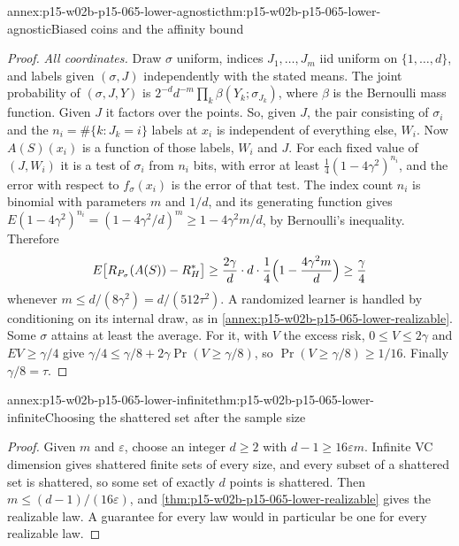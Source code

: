 \begin{annexitem}{annex:p15-w02b-p15-065-lower-agnostic}{thm:p15-w02b-p15-065-lower-agnostic}{Biased coins and the affinity bound}
\begin{proof}
\emph{All coordinates.} Draw \(\sigma\) uniform, indices \(J_1,\ldots,J_m\)
iid uniform on \(\{1,\ldots,d\}\), and labels given \((\sigma,J)\)
independently with the stated means. The joint probability of
\((\sigma,J,Y)\) is \(2^{-d}d^{-m}\prod_k\beta(Y_k;\sigma_{J_k})\), where
\(\beta\) is the Bernoulli mass function. Given \(J\) it factors over the
points. So, given \(J\), the pair consisting of \(\sigma_i\) and the
\(n_i=\#\{k:J_k=i\}\) labels at \(x_i\) is independent of everything else,
\(W_i\). Now \(A(S)(x_i)\) is a function of those labels, \(W_i\) and
\(J\). For each fixed value of \((J,W_i)\) it is a test of \(\sigma_i\)
from \(n_i\) bits, with error at least \(\frac14(1-4\gamma^2)^{n_i}\), and
the error with respect to \(f_\sigma(x_i)\) is the error of that test.
The index count \(n_i\) is binomial with parameters \(m\) and \(1/d\), and its
generating function gives
\(E(1-4\gamma^2)^{n_i}=(1-4\gamma^2/d)^m\geq1-4\gamma^2m/d\), by
Bernoulli's inequality. Therefore
\[
 E\bigl[R_{P_\sigma}(A(S))-R_H^{*}\bigr]\geq\frac{2\gamma}d\cdot d\cdot
 \frac14\Bigl(1-\frac{4\gamma^2m}d\Bigr)\geq\frac\gamma4
\]
whenever \(m\leq d/(8\gamma^2)=d/(512\tau^2)\). A randomized learner is
handled by conditioning on its internal draw, as in
\cref{annex:p15-w02b-p15-065-lower-realizable}. Some \(\sigma\) attains at
least the average. For it, with \(V\) the excess risk, \(0\leq V\leq2\gamma\)
and \(EV\geq\gamma/4\) give
\(\gamma/4\leq\gamma/8+2\gamma\Pr(V\geq\gamma/8)\), so
\(\Pr(V\geq\gamma/8)\geq1/16\). Finally \(\gamma/8=\tau\).
\end{proof}
\end{annexitem}

\begin{annexitem}{annex:p15-w02b-p15-065-lower-infinite}{thm:p15-w02b-p15-065-lower-infinite}{Choosing the shattered set after the sample size}
\begin{proof}
Given \(m\) and \(\varepsilon\), choose an integer \(d\geq2\) with
\(d-1\geq16\varepsilon m\). Infinite VC dimension gives shattered finite
sets of every size, and every subset of a shattered set is shattered, so
some set of exactly \(d\) points is shattered. Then
\(m\leq(d-1)/(16\varepsilon)\), and
\cref{thm:p15-w02b-p15-065-lower-realizable} gives the realizable law.
A guarantee for every law would in particular be one for every realizable
law.
\end{proof}
\end{annexitem}

